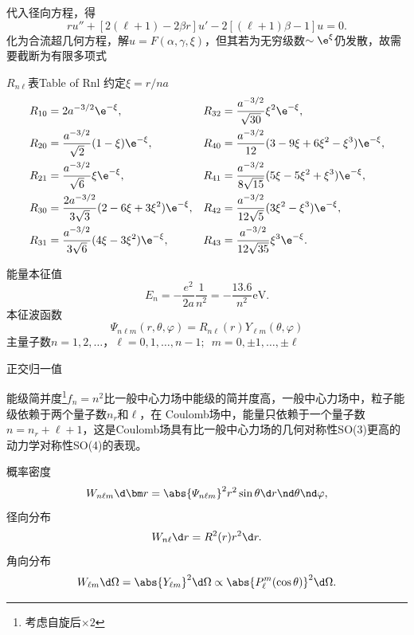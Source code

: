 代入径向方程，得
\[
	ru''+[2(\ell+1)-2\beta r]u'-2[(\ell+1)\beta-1]u=0.
\]
化为合流超几何方程，解$u=F(\alpha,\gamma,\xi)$，但其若为无穷级数$\sim\e^{\xi}$仍发散，故需要截断为有限多项式
\begin{example}{$R_{n\ell}$表}{Table of Rnl}
	约定$\xi=r/na$
	\begin{align*}
		R_{10} & =2a^{-3/2}\e^{-\xi},&R_{32} & =\frac{a^{-3/2}}{\sqrt{30}}\xi^2\e^{-\xi},\\
		R_{20} & =\frac{a^{-3/2}}{\sqrt2}(1-\xi)\e^{-\xi},&R_{40} & =\frac{a^{-3/2}}{12}(3-9\xi+6\xi^2-\xi^3)\e^{-\xi},\\
		R_{21} & =\frac{a^{-3/2}}{\sqrt6}\xi\e^{-\xi},&R_{41} & =\frac{a^{-3/2}}{8\sqrt{15}}(5\xi-5\xi^2+\xi^3)\e^{-\xi},\\
		R_{30} & =\frac{2a^{-3/2}}{3\sqrt3}(2-6\xi+3\xi^2)\e^{-\xi},&R_{42} & =\frac{a^{-3/2}}{12\sqrt5}(3\xi^2-\xi^3)\e^{-\xi},\\
		R_{31} & =\frac{a^{-3/2}}{3\sqrt6}(4\xi-3\xi^2)\e^{-\xi},&R_{43} & =\frac{a^{-3/2}}{12\sqrt{35}}\xi^3\e^{-\xi}.
	\end{align*}
\end{example}
能量本征值
\[
	E_n=-\frac{e^2}{2a}\frac1{n^2}=-\frac{13.6}{n^2}\si\eV.
\]
本征波函数
\[
	\varPsi_{n\ell m}(r,\theta,\varphi)=R_{n\ell}(r)Y_{\ell m}(\theta,\varphi)
\]
主量子数$n=1,2,\ldots$，$\ell=0,1,\ldots,n-1;\enspace m=0,\pm 1,\ldots,\pm\ell$

正交归一值

能级简并度\footnote{考虑自旋后$\times 2$}$f_n=n^2$比一般中心力场中能级的简并度高，一般中心力场中，粒子能级依赖于两个量子数$n_r$和$\ell$，在
Coulomb场中，能量只依赖于一个量子数$n=n_r+\ell+1$，这是Coulomb场具有比一般中心力场的几何对称性SO(3)更高的动力学对称性SO(4)的表现。

概率密度
\[
	W_{n\ell m}\d\bm r=\abs{\varPsi_{n\ell m}}^2r^2\sin\theta\d r\nd\theta\nd\varphi,
\]
径向分布
\[
	W_{n\ell}\d r=R^2(r)r^2\d r.
\]
角向分布
\[
	W_{\ell m}\d\Omega=\abs{Y_{\ell m}}^2\d\Omega\propto\abs{P_\ell^m(\cos\theta)}^2\d\Omega.
\]
